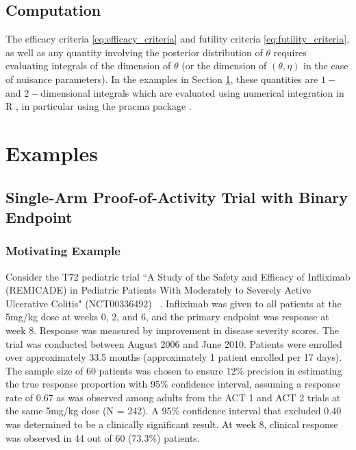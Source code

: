 \documentclass[useAMS,usenatbib,referee]{biom}
\begin{document}

\subsection{Computation}
The efficacy criteria \eqref{eq:efficacy_criteria} and futility criteria \eqref{eq:futility_criteria}, as well as any quantity involving the posterior distribution of $\theta$ requires evaluating integrals of the dimension of $\theta$ (or the dimension of $(\theta,\eta)$ in the case of nuisance parameters). In the examples in Section \ref{sec:examples}, these quantities are $1-$ and $2-$dimensional integrals which are evaluated using numerical integration in R \citep{R2017}, in particular using the pracma package \citep{Borchers2019}.

\section{Examples}\label{sec:examples}

\subsection{Single-Arm Proof-of-Activity Trial with Binary Endpoint}\label{sec:example1}
\subsubsection{Motivating Example}
Consider the T72 pediatric trial ``A Study of the Safety and Efficacy of Infliximab (REMICADE) in Pediatric Patients With Moderately to Severely Active Ulcerative Colitis" (NCT00336492) ~\citep{Hyams2012}. Infliximab was given to all patients at the 5mg/kg dose at weeks 0, 2, and 6, and the primary endpoint was response at week 8. Response was measured by improvement in disease severity scores. The trial was conducted between August 2006 and June 2010. Patients were enrolled over approximately 33.5 months (approximately 1 patient enrolled per 17 days). The sample size of 60 patients was chosen to ensure 12\% precision in estimating the true
response proportion with 95\% confidence interval, assuming a response rate of 0.67 as was observed among adults from the ACT 1 and ACT 2 trials \citep{Rutgeerts2005} at the same 5mg/kg dose (N = 242). A 95\% confidence interval that excluded 0.40 was determined to be a clinically significant result. At week 8, clinical response was observed in 44 out of 60 (73.3\%) patients.
\end{document}
